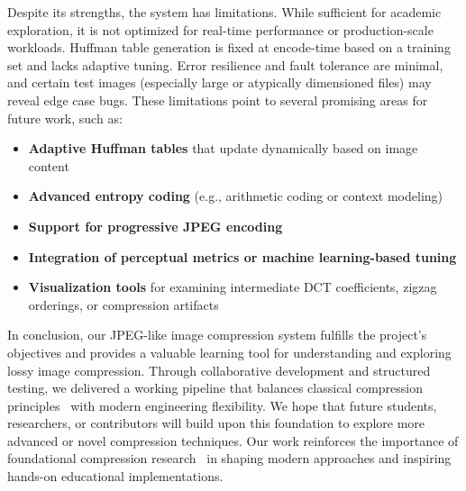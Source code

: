 Despite its strengths, the system has limitations. While sufficient for academic exploration, it is not optimized for real-time performance or production-scale workloads. Huffman table generation is fixed at encode-time based on a training set and lacks adaptive tuning. Error resilience and fault tolerance are minimal, and certain test images (especially large or atypically dimensioned files) may reveal edge case bugs. These limitations point to several promising areas for future work, such as:

\begin{itemize}
    \item \textbf{Adaptive Huffman tables} that update dynamically based on image content
    \item \textbf{Advanced entropy coding} (e.g., arithmetic coding or context modeling)
    \item \textbf{Support for progressive JPEG encoding}
    \item \textbf{Integration of perceptual metrics or machine learning-based tuning}
    \item \textbf{Visualization tools} for examining intermediate DCT coefficients, zigzag orderings, or compression artifacts
\end{itemize}

In conclusion, our JPEG-like image compression system fulfills the project’s objectives and provides a valuable learning tool for understanding and exploring lossy image compression. Through collaborative development and structured testing, we delivered a working pipeline that balances classical compression principles~\cite{jpegOverview2025} with modern engineering flexibility. We hope that future students, researchers, or contributors will build upon this foundation to explore more advanced or novel compression techniques. Our work reinforces the importance of foundational compression research~\cite{haines1992compression} in shaping modern approaches and inspiring hands-on educational implementations.